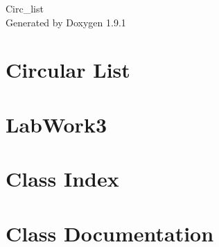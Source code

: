 \let\mypdfximage\pdfximage\def\pdfximage{\immediate\mypdfximage}\documentclass[twoside]{book}
\newcommand{\+}{\discretionary{\mbox{\scriptsize$\hookleftarrow$}}{}{}}
\newcommand{\clearemptydoublepage}{%
  \newpage{\pagestyle{empty}\cleardoublepage}%
}
\begin{document}
\raggedbottom

\hypersetup{pageanchor=false,
             bookmarksnumbered=true,
             pdfencoding=unicode
            }
\begin{titlepage}
\vspace*{7cm}
\begin{center}%
{\Large Circ\+\_\+list }\\
\vspace*{1cm}
{\large Generated by Doxygen 1.9.1}\\
\end{center}
\end{titlepage}
\clearemptydoublepage
{}
\tableofcontents
\clearemptydoublepage
{}
\hypersetup{pageanchor=true}

\chapter{Circular List}
\label{md_documentation}

\chapter{Lab\+Work3}
\label{md_README}

\chapter{Class Index}

\chapter{Class Documentation}



\backmatter
\newpage
{}
\clearemptydoublepage
{}
\printindex
\end{document}
